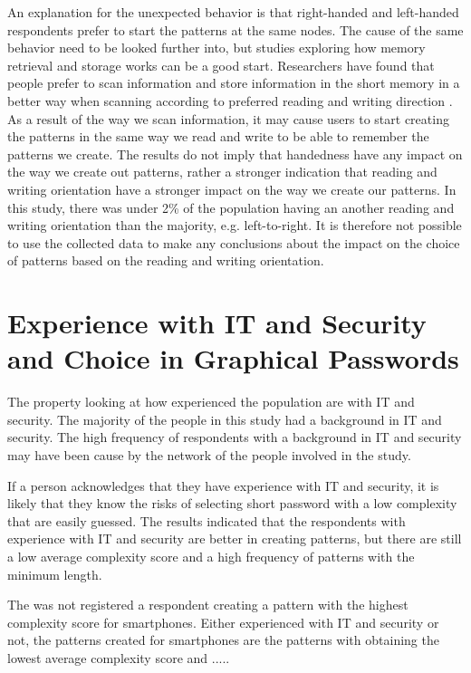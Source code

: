     An explanation for the unexpected behavior is that right-handed and left-handed respondents prefer to start the patterns at the same nodes. The cause of the same behavior need to be looked further into, but studies exploring how memory retrieval and storage works can be a good start. Researchers have found that people prefer to scan information and store information in the short memory in a better way when scanning according to preferred reading and writing direction \cite{Chan}. As a result of the way we scan information, it may cause users to start creating the patterns in the same way we read and write to be able to remember the patterns we create. The results do not imply that handedness have any impact on the way we create out patterns, rather a stronger indication that reading and writing orientation have a stronger impact on the way we create our patterns. In this study, there was under 2\% of the population having an another reading and writing orientation than the majority, e.g. left-to-right. It is therefore not possible to use the collected data to make any conclusions about the impact on the choice of patterns based on the reading and writing orientation.

  \section{Experience with IT and Security and Choice in Graphical Passwords}
    
    The property looking at how experienced the population are with IT and security. The majority of the people in this study had a background in IT and security. The high frequency of respondents with a background in IT and security may have been cause by the network of the people involved in the study.

    If a person acknowledges that they have experience with IT and security, it is likely that they know the risks of selecting short password with a low complexity that are easily guessed. The results indicated that the respondents with experience with IT and security are better in creating patterns, but there are still a low average complexity score and a high frequency of patterns with the minimum length. 

    The was not registered a respondent creating a pattern with the highest complexity score for smartphones. Either experienced with IT and security or not, the patterns created for smartphones are the patterns with obtaining the lowest average complexity score and .....

